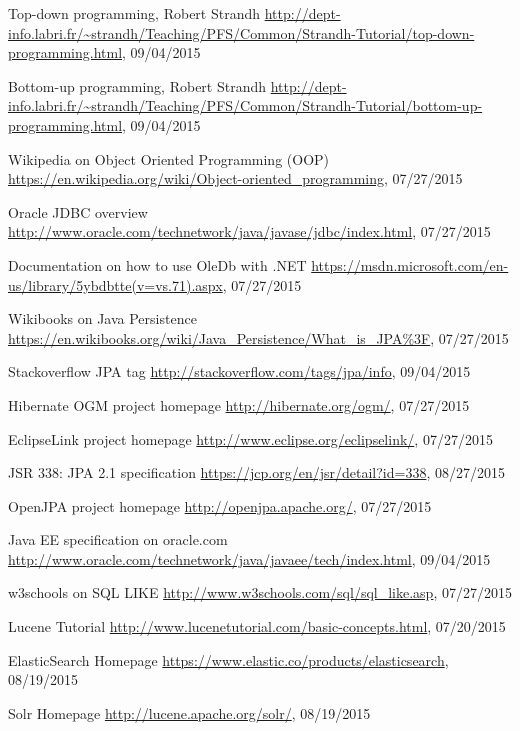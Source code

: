 \begin{thebibliography}{100}
	 Top-down programming, Robert Strandh
	\url{http://dept-info.labri.fr/~strandh/Teaching/PFS/Common/Strandh-Tutorial/top-down-programming.html},
	09/04/2015
	
	 Bottom-up programming, Robert Strandh
	\url{http://dept-info.labri.fr/~strandh/Teaching/PFS/Common/Strandh-Tutorial/bottom-up-programming.html},
	09/04/2015
	
	 Wikipedia on Object Oriented Programming (OOP)
	\url{https://en.wikipedia.org/wiki/Object-oriented_programming}, 07/27/2015
	
	 Oracle JDBC overview
	\url{http://www.oracle.com/technetwork/java/javase/jdbc/index.html}, 07/27/2015
	
	 Documentation on how to use OleDb with .NET
	\url{https://msdn.microsoft.com/en-us/library/5ybdbtte(v=vs.71).aspx}, 07/27/2015
	
	 Wikibooks on Java Persistence
	\url{https://en.wikibooks.org/wiki/Java_Persistence/What_is_JPA\%3F}, 07/27/2015
	
	 Stackoverflow JPA tag
	\url{http://stackoverflow.com/tags/jpa/info}, 09/04/2015
	
	 Hibernate OGM project homepage
	\url{http://hibernate.org/ogm/}, 07/27/2015
	
	 EclipseLink project homepage
	\url{http://www.eclipse.org/eclipselink/}, 07/27/2015
	
	 JSR 338: JPA 2.1 specification
	\url{https://jcp.org/en/jsr/detail?id=338}, 08/27/2015
	
	 OpenJPA project homepage
	\url{http://openjpa.apache.org/}, 07/27/2015
	
	 Java EE specification on oracle.com
	\url{http://www.oracle.com/technetwork/java/javaee/tech/index.html}, 09/04/2015
	
	 w3schools on SQL LIKE
	\url{http://www.w3schools.com/sql/sql_like.asp}, 07/27/2015
	
	 Lucene Tutorial
	\url{http://www.lucenetutorial.com/basic-concepts.html}, 07/20/2015
	
	 ElasticSearch Homepage
	\url{https://www.elastic.co/products/elasticsearch}, 08/19/2015
	
	 Solr Homepage
	\url{http://lucene.apache.org/solr/}, 08/19/2015
	

\end{thebibliography}
